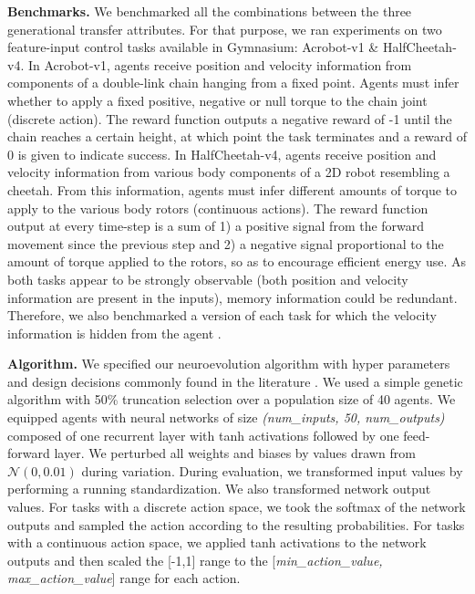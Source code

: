\documentclass[dvipsnames,format=sigconf,anonymous=false,review=false]{acmart}
\begin{document}
\textbf{Benchmarks.} We benchmarked all the combinations between the three generational transfer attributes. For that purpose, we ran experiments on two feature-input control tasks available in Gymnasium: Acrobot-v1 \& HalfCheetah-v4. In Acrobot-v1, agents receive position and velocity information from components of a double-link chain hanging from a fixed point. Agents must infer whether to apply a fixed positive, negative or null torque to the chain joint (discrete action). The reward function outputs a negative reward of -1 until the chain reaches a certain height, at which point the task terminates and a reward of 0 is given to indicate success. In HalfCheetah-v4, agents receive position and velocity information from various body components of a 2D robot resembling a cheetah. From this information, agents must infer different amounts of torque to apply to the various body rotors (continuous actions). The reward function output at every time-step is a sum of 1) a positive signal from the forward movement since the previous step and 2) a negative signal proportional to the amount of torque applied to the rotors, so as to encourage efficient energy use. As both tasks appear to be strongly observable (both position and velocity information are present in the inputs), memory information could be redundant. Therefore, we also benchmarked a version of each task for which the velocity information is hidden from the agent  \cite{morad2023popgym}.

\textbf{Algorithm.} We specified our neuroevolution algorithm with hyper parameters and design decisions commonly found in the literature \cite{salimans2017evolution, such2017deep, leclei2022neuroevolution}. We used a simple genetic algorithm with 50\% truncation selection over a population size of 40 agents. We equipped agents with neural networks of size \textit{(num\_inputs, 50, num\_outputs)} composed of one recurrent layer with tanh activations followed by one feed-forward layer. We perturbed all weights and biases by values drawn from $\mathcal{N}(0,0.01)$ during variation. During evaluation, we transformed input values by performing a running standardization. We also transformed network output values. For tasks with a discrete action space, we took the softmax of the network outputs and sampled the action according to the resulting probabilities. For tasks with a continuous action space, we applied tanh activations to the network outputs and then scaled the [-1,1] range to the [\textit{min\_action\_value, max\_action\_value}] range for each action. 
\end{document}
